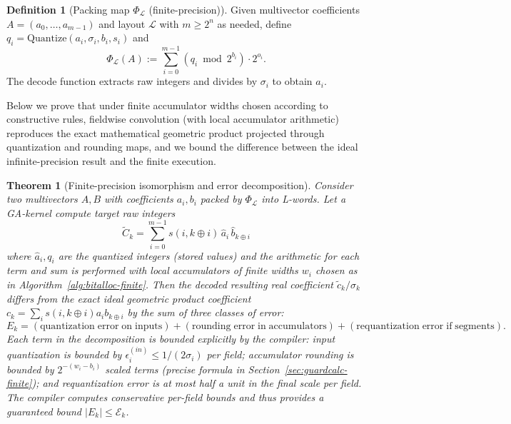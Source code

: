 \documentclass[11pt]{article}
\theoremstyle{definition}
\newtheorem{definition}{Definition}[section]
\theoremstyle{plain}
\newtheorem{theorem}{Theorem}[section]
\begin{document}
\begin{definition}[Packing map $\Phi_{\mathcal{L}}$ (finite-precision)]
Given multivector coefficients $A=(a_0,\dots,a_{m-1})$ and layout $\mathcal{L}$ with $m\ge 2^n$ as needed, define $q_i = \mathrm{Quantize}(a_i,\sigma_i,b_i,s_i)$ and
$$
\Phi_{\mathcal{L}}(A) := \sum_{i=0}^{m-1} (q_i \bmod 2^{b_i})\cdot 2^{o_i}.
$$
The decode function extracts raw integers and divides by $\sigma_i$ to obtain $\hat a_i$.
\end{definition}

Below we prove that under finite accumulator widths chosen according to constructive rules, fieldwise convolution (with local accumulator arithmetic) reproduces the exact mathematical geometric product projected through quantization and rounding maps, and we bound the difference between the ideal infinite-precision result and the finite execution.

\begin{theorem}[Finite-precision isomorphism and error decomposition]
\label{thm:finite-isom}
Consider two multivectors $A,B$ with coefficients $a_i,b_i$ packed by $\Phi_{\mathcal{L}}$ into L-words. Let a GA-kernel compute target raw integers
$$
\tilde C_k = \sum_{i=0}^{m-1} s(i,k\oplus i)\, \hat a_i\, \hat b_{k\oplus i}
$$
where $\hat a_i,q_i$ are the quantized integers (stored values) and the arithmetic for each term and sum is performed with local accumulators of finite widths $w_i$ chosen as in Algorithm~\ref{alg:bitalloc-finite}. Then the decoded resulting real coefficient $\tilde c_k/\sigma_k$ differs from the exact ideal geometric product coefficient $c_k = \sum_i s(i,k\oplus i) a_i b_{k\oplus i}$ by the sum of three classes of error:
\begin{equation}\label{eq:error-decomp}
E_k = (\mathrm{quantization\;error\;on\;inputs}) + (\mathrm{rounding\;error\;in\;accumulators}) + (\mathrm{requantization\;error\;if\;segments}).
\end{equation}
Each term in the decomposition is bounded explicitly by the compiler: input quantization is bounded by $\epsilon^{(in)}_i\le 1/(2\sigma_i)$ per field; accumulator rounding is bounded by $2^{-(w_i-b_i)}$ scaled terms (precise formula in Section~\ref{sec:guardcalc-finite}); and requantization error is at most half a unit in the final scale per field.  The compiler computes conservative per-field bounds and thus provides a guaranteed bound $|E_k|\le \mathcal{E}_k$.
\end{theorem}
\end{document}
